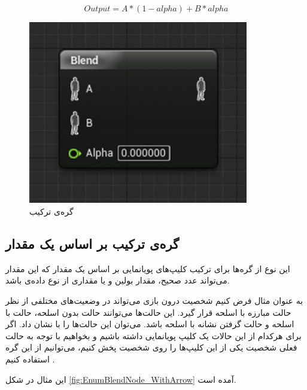 \begin{equation}\label{eq:BlendNode}
	Output= A * (1-alpha) + B * alpha
\end{equation}



\begin{figure}[ht]
	\centerline{\includegraphics[width=\textwidth,height=8cm,keepaspectratio]{Figures/Ch3/BlendNode.png}}\hfill
	\caption{ گره‌ی ترکیب }
	\label{fig:BlendNode}
\end{figure}

\subsection{ گره‌ی ترکیب بر اساس یک مقدار}

این نوع از گره‌ها برای ترکیب کلیپ‌های پویانمایی بر اساس یک مقدار 
که این مقدار می‌تواند عدد صحیح، مقدار بولین و یا مقداری از 
نوع داده‌ی 
باشد.

به عنوان مثال فرض کنیم شخصیت درون بازی می‌تواند در وضعیت‌های مختلفی از نظر
حالت مبارزه با اسلحه قرار گیرد. این حالت‌ها می‌توانند حالت بدون اسلحه، 
حالت با اسلحه و حالت گرفتن نشانه با اسلحه باشد.
می‌توان این حالت‌ها را با
نشان داد.
اگر برای هرکدام از این حالات یک کلیپ پویانمایی داشته باشیم و بخواهیم 
با توجه به حالت فعلی شخصیت یکی از این کلیپ‌ها را روی شخصیت پخش کنیم،
می‌توانیم از این گره استفاده کنیم \cite{BlendNodeUnrealEngine}.

این مثال در شکل 
\ref{fig:EnumBlendNode_WithArrow}
آمده است.

